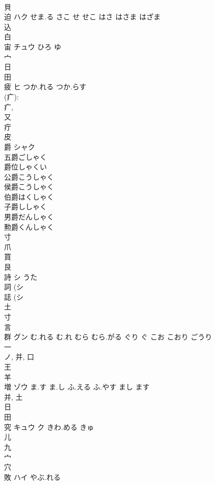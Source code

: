 \documentclass[8pt]{extreport}
\begin{document}
\begin{CJK}{UTF8}{min}
\\	貝 
\\	迫	ハク	せま.る さこ せ せこ はさ はさま はざま	
\\	込 
\\	白 
\\	宙	チュウ	ひろ ゆ	
\\	宀 
\\	日 
\\	田 
\\	疲	ヒ	つか.れる つか.らす	
\\	(疒): 
\\	疒, 
\\	又 
\\	疔 
\\	皮 
\\	爵	シャク		
\\	五爵ごしゃく 
\\	爵位しゃくい 
\\	公爵こうしゃく 
\\	侯爵こうしゃく 
\\	伯爵はくしゃく 
\\	子爵ししゃく 
\\	男爵だんしゃく 
\\	勲爵くんしゃく 
\\	寸 
\\	爪 
\\	買 
\\	艮 
\\	詩	シ	うた	
\\	詞 (シ 
\\	誌 (シ 
\\	土 
\\	寸 
\\	言 
\\	群	グン	む.れる む.れ むら むら.がる ぐり ぐ こお こおり ごうり	
\\	一 
\\	ノ, 并, 口 
\\	王 
\\	羊 
\\	増	ゾウ	ま.す ま.し ふ.える ふ.やす まし ます	
\\	并, 土 
\\	日 
\\	田 
\\	究	キュウ ク	きわ.める きゅ	
\\	儿 
\\	九 
\\	宀 
\\	穴 
\\	敗	ハイ	やぶ.れる	

\end{CJK}
\end{document}
